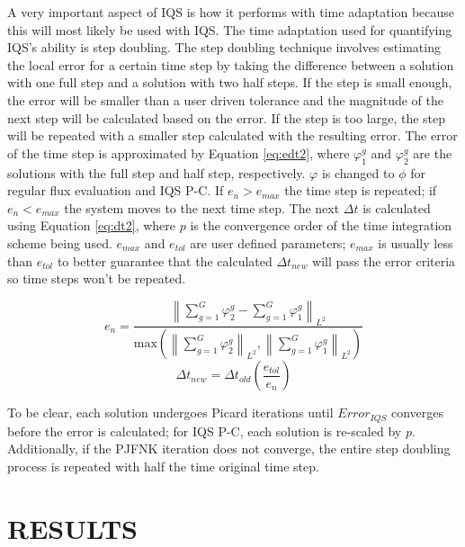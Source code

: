 \documentclass[10pt]{scrartcl}
\newcommand{\norm}[1]{\left\lVert#1\right\rVert_{L^2}}
\newcommand{\be}{\begin{equation}}
\newcommand{\ee}{\end{equation}}
\begin{document}
A very important aspect of IQS is how it performs with time adaptation because this will most likely be used with IQS.  The time adaptation used for quantifying IQS's ability is step doubling.  The step doubling technique involves estimating the local error for a certain time step by taking the difference between a solution with one full step and a solution with two half steps.  If the step is small enough, the error will be smaller than a user driven tolerance and the magnitude of the next step will be calculated based on the error.  If the step is too large, the step will be repeated with a smaller step calculated with the resulting error.  The error of the time step is approximated by Equation \ref{eq:edt2}, where $\varphi^g_1$ and $\varphi^g_2$ are the solutions with the full step and half step, respectively.  $\varphi$ is changed to $\phi$ for regular flux evaluation and IQS P-C.  If $e_n > e_{max}$ the time step is repeated; if $e_n < e_{max}$ the system moves to the next time step.  The next $\Delta t$ is calculated using Equation \ref{eq:dt2}, where $p$ is the convergence order of the time integration scheme being used.  $e_{max}$ and $e_{tol}$ are user defined parameters; $e_{max}$ is usually less than $e_{tol}$ to better guarantee that the calculated $\Delta t_{new}$ will pass the error criteria so time steps won't be repeated.

\be
e_n = \frac{\norm{\sum_{g=1}^G\varphi^g_2 - \sum_{g=1}^G\varphi^g_1}}{\text{max}\left(\norm{\sum_{g=1}^G\varphi^g_2},\norm{\sum_{g=1}^G\varphi^g_1}\right)}
\label{eq:edt2}
\ee
\be
\Delta t_{new} = \Delta t_{old} \left(\frac{e_{tol}}{e_n}\right)
\label{eq:dt2}
\ee

To be clear, each solution undergoes Picard iterations until $Error_{IQS}$ converges before the error is calculated; for IQS P-C, each solution is re-scaled by $p$.  Additionally, if the PJFNK iteration does not converge, the entire step doubling process is repeated with half the time original time step. 

\newpage
%
\section{RESULTS} 
\label{sect::results}
\end{document}
